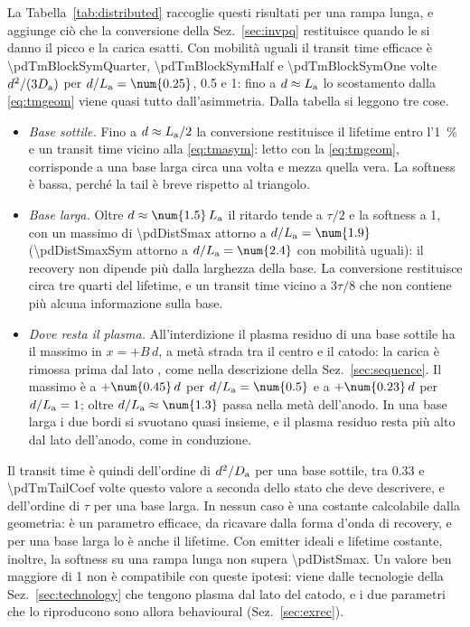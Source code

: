 \documentclass[10pt,a4paper]{scrartcl}
\let\newcommand\pdvaluedefine
\newcommand{\Da}{D_\mathrm{a}}
\newcommand{\La}{L_\mathrm{a}}
\newcommand{\Pp}{p\textsuperscript{+}}
\begin{document}
La Tabella~\ref{tab:distributed} raccoglie questi risultati per una rampa lunga, e aggiunge ciò che la conversione della Sez.~\ref{sec:invpq} restituisce quando le si danno il picco e la carica esatti. Con mobilità uguali il transit time efficace è \num{\pdTmBlockSymQuarter}, \num{\pdTmBlockSymHalf} e \num{\pdTmBlockSymOne} volte $d^2/(3\Da)$ per $d/\La = \num{0.25}$, \num{0.5} e 1: fino a $d \approx \La$ lo scostamento dalla \eqref{eq:tmgeom} viene quasi tutto dall'asimmetria. Dalla tabella si leggono tre cose.
\begin{itemize}
\item \emph{Base sottile.} Fino a $d \approx \La/2$ la conversione restituisce il lifetime entro l'\SI{1}{\percent} e un transit time vicino alla \eqref{eq:tmasym}: letto con la \eqref{eq:tmgeom}, corrisponde a una base larga circa una volta e mezza quella vera. La softness è bassa, perché la tail è breve rispetto al triangolo.
\item \emph{Base larga.} Oltre $d \approx \num{1.5}\,\La$ il ritardo tende a $\tau/2$ e la softness a 1, con un massimo di \num{\pdDistSmax} attorno a $d/\La = \num{\pdDistSmaxBeta}$ (\num{\pdDistSmaxSym} attorno a $d/\La = \num{\pdDistSmaxBetaSym}$ con mobilità uguali): il recovery non dipende più dalla larghezza della base. La conversione restituisce circa tre quarti del lifetime, e un transit time vicino a $3\tau/8$ che non contiene più alcuna informazione sulla base.
\item \emph{Dove resta il plasma.} All'interdizione il plasma residuo di una base sottile ha il massimo in $x = +B\,d$, a metà strada tra il centro e il catodo: la carica è rimossa prima dal lato \Pp, come nella descrizione della Sez.~\ref{sec:sequence}. Il massimo è a $+\num{\pdTmPeakPosHalf}\,d$ per $d/\La = \num{0.5}$ e a $+\num{\pdTmPeakPosOne}\,d$ per $d/\La = 1$; oltre $d/\La \approx \num{\pdTmPeakZeroBeta}$ passa nella metà dell'anodo. In una base larga i due bordi si svuotano quasi insieme, e il plasma residuo resta più alto dal lato dell'anodo, come in conduzione.
\end{itemize}

Il transit time è quindi dell'ordine di $d^2/\Da$ per una base sottile, tra \num{0.33} e \num{\pdTmTailCoef} volte questo valore a seconda dello stato che deve descrivere, e dell'ordine di $\tau$ per una base larga. In nessun caso è una costante calcolabile dalla geometria: è un parametro efficace, da ricavare dalla forma d'onda di recovery, e per una base larga lo è anche il lifetime. Con emitter ideali e lifetime costante, inoltre, la softness su una rampa lunga non supera \num{\pdDistSmax}. Un valore ben maggiore di 1 non è compatibile con queste ipotesi: viene dalle tecnologie della Sez.~\ref{sec:technology} che tengono plasma dal lato del catodo, e i due parametri che lo riproducono sono allora behavioural (Sez.~\ref{sec:exrec}).
\end{document}
